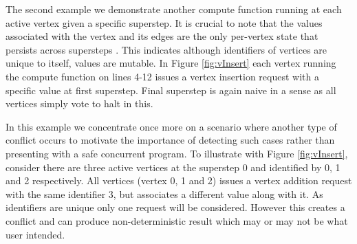 The second example we demonstrate another compute function running at each active vertex given a specific superstep. It is crucial to note that the values associated with the vertex and its edges are the only per-vertex state that persists across supersteps \cite{Pregel2010}. This indicates although identifiers of vertices are unique to itself, values are mutable. In Figure \ref{fig:vInsert} each vertex running the compute function on lines 4-12 issues a vertex insertion request with a specific value at first superstep. Final superstep is again naive in a sense as all vertices simply vote to halt in this.

In this example we concentrate once more on a scenario where another type of conflict occurs to motivate the importance of detecting such cases rather than presenting with a safe concurrent program. To illustrate with Figure \ref{fig:vInsert}, consider there are three active vertices at the superstep 0 and identified by 0, 1 and 2 respectively. All vertices (vertex 0, 1 and 2) issues a vertex addition request with the same identifier 3, but associates a different value along with it. As identifiers are unique only one request will be considered. However this creates a conflict and can produce non-deterministic result which may or may not be what user intended. 




